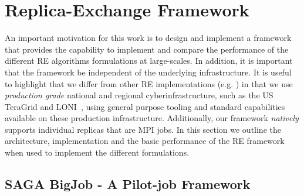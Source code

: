 \documentclass{rspublic}
\begin{document}
\section{Replica-Exchange Framework}\label{repexfw}

An important motivation for this work is to design and implement a
framework that provides the capability to implement and compare the
performance of the different RE algorithms formulations at
large-scales.  In addition, it is important that the framework be
independent of the underlying infrastructure.  It is useful to
highlight that we differ from other RE implementations (e.g.
\cite{parashar_arepex}) in that we use {\it production grade} national
and regional cyberinfrastructure, such as the US TeraGrid and
LONI~\citep{LONI_web}, using general purpose tooling and standard
capabilities available on these production infrastructure.
Additionally, our framework {\it natively} supports individual
replicas that are MPI jobs. In this section we outline the
architecture, implementation and the basic performance of the RE
framework when used to implement the different formulations.



\subsection{SAGA BigJob - A Pilot-job Framework}
\label{sec:BigJob}

\end{document}
